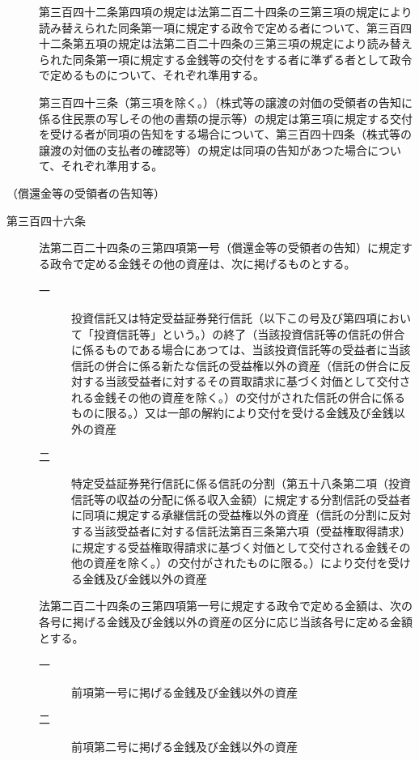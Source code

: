 \documentclass[twocolumn,a4j,10pt]{ltjtarticle}
\begin{document}
\begin{description}
\item[]第三百四十二条第四項の規定は法第二百二十四条の三第三項の規定により読み替えられた同条第一項に規定する政令で定める者について、第三百四十二条第五項の規定は法第二百二十四条の三第三項の規定により読み替えられた同条第一項に規定する金銭等の交付をする者に準ずる者として政令で定めるものについて、それぞれ準用する。
\item[]第三百四十三条（第三項を除く。）（株式等の譲渡の対価の受領者の告知に係る住民票の写しその他の書類の提示等）の規定は第三項に規定する交付を受ける者が同項の告知をする場合について、第三百四十四条（株式等の譲渡の対価の支払者の確認等）の規定は同項の告知があつた場合について、それぞれ準用する。
\end{description}
\noindent\hspace{10pt}（償還金等の受領者の告知等）
\begin{description}
\item[第三百四十六条]法第二百二十四条の三第四項第一号（償還金等の受領者の告知）に規定する政令で定める金銭その他の資産は、次に掲げるものとする。
\begin{description}
\item[一]投資信託又は特定受益証券発行信託（以下この号及び第四項において「投資信託等」という。）の終了（当該投資信託等の信託の併合に係るものである場合にあつては、当該投資信託等の受益者に当該信託の併合に係る新たな信託の受益権以外の資産（信託の併合に反対する当該受益者に対するその買取請求に基づく対価として交付される金銭その他の資産を除く。）の交付がされた信託の併合に係るものに限る。）又は一部の解約により交付を受ける金銭及び金銭以外の資産
\item[二]特定受益証券発行信託に係る信託の分割（第五十八条第二項（投資信託等の収益の分配に係る収入金額）に規定する分割信託の受益者に同項に規定する承継信託の受益権以外の資産（信託の分割に反対する当該受益者に対する信託法第百三条第六項（受益権取得請求）に規定する受益権取得請求に基づく対価として交付される金銭その他の資産を除く。）の交付がされたものに限る。）により交付を受ける金銭及び金銭以外の資産
\end{description}
\item[]法第二百二十四条の三第四項第一号に規定する政令で定める金額は、次の各号に掲げる金銭及び金銭以外の資産の区分に応じ当該各号に定める金額とする。
\begin{description}
\item[一]前項第一号に掲げる金銭及び金銭以外の資産
\item[二]前項第二号に掲げる金銭及び金銭以外の資産
\end{description}

\end{description}
\end{document}
